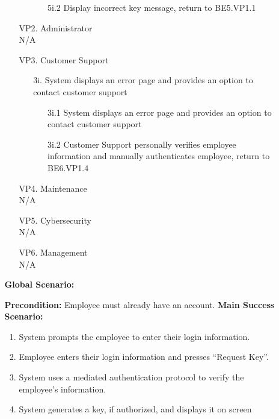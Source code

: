 \documentclass[]{article}
\begin{document}
\begin{enumerate}[{\bf BE1.}]
\begin{enumerate}[{\bf BE5.}]
\begin{enumerate}
\begin{enumerate}
\begin{enumerate}
                        \item[5i.2] Display incorrect key message, return to BE5.VP1.1 
                    \end{enumerate}
                \end{enumerate}
            \item[VP2.] Administrator \\
            \indent N/A 
            \item[VP3.] Customer Support \\
            \begin{enumerate}
                \item[3i.] System displays an error page and provides an option to contact customer support
                \begin{enumerate}
                    \item[3i.1] System displays an error page and provides an option to contact customer support
                    \item[3i.2] Customer Support personally verifies employee information and manually authenticates employee, return to BE6.VP1.4
                \end{enumerate}
            \end{enumerate}
            \item[VP4.] Maintenance \\
            \indent N/A 
            \item[VP5.] Cybersecurity \\
            \indent N/A 
            \item[VP6.] Management \\
            \indent N/A 
        \end{enumerate}
        {\bf Global Scenario:}\\
        \begin{enumerate}
            \textbf{Precondition:} Employee must already have an account.
            \textbf{Main Success Scenario:}
            \begin{enumerate}
                \item System prompts the employee to enter their login information.  
                \item Employee enters their login information and presses “Request Key”.  
                \item System uses a mediated authentication protocol to verify the employee’s information. 
                \item System generates a key, if authorized, and displays it on screen 

\end{enumerate}
\end{enumerate}
\end{enumerate}
\end{enumerate}
\end{document}
